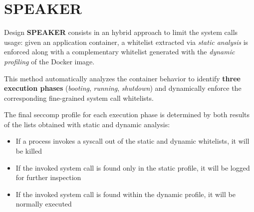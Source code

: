 \documentclass{beamer}
\begin{document}
\section{SPEAKER}

\begin{frame}{Design}
\textbf{SPEAKER} consists in an hybrid approach to limit the system calls usage: given an application container, a whitelist extracted via \emph{static analysis} is enforced along with a complementary whitelist generated with the \emph{dynamic profiling} of the Docker image.

\vspace{0.2cm}
This method automatically analyzes the container behavior to identify \textbf{three execution phases} (\emph{booting}, \emph{running}, \emph{shutdown}) and  dynamically enforce the corresponding fine-grained system call whitelists. 

\vspace{0.2cm}
The final seccomp profile for each execution phase is determined by both results of the lists obtained with static and dynamic analysis:
\begin{itemize}
    \item If a process invokes a syscall out of the static and dynamic whitelists, it will be killed
    \item If the invoked system call is found only in the static profile, it will be logged for further inspection
    \item If the invoked system call is found within the dynamic profile, it will be normally executed
\end{itemize}
\end{frame}
\end{document}
